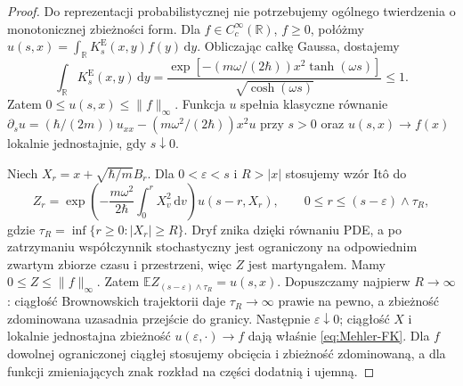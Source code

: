 \documentclass[11pt,a4paper,oneside]{report}
\numberwithin{equation}{chapter}
\theoremstyle{plain}
\theoremstyle{definition}
\theoremstyle{remark}
\newcommand{\R}{\mathbb{R}}
\newcommand{\E}{\mathbb{E}}
\newcommand{\dd}{\mathrm{d}}
\begin{document}
\begin{proof}
Do reprezentacji probabilistycznej nie potrzebujemy
ogólnego twierdzenia o monotonicznej zbieżności form.
Dla $f\in C_c^\infty(\R)$, $f\ge0$, połóżmy
$u(s,x)=\int_{\R}K_s^{\mathrm E}(x,y)f(y)\,\dd y$.
Obliczając całkę Gaussa, dostajemy
\[
 \int_{\R} K_s^{\mathrm E}(x,y)\,\dd y
 =\frac{\exp[-(m\omega/(2\hbar))x^2\tanh(\omega s)]}
        {\sqrt{\cosh(\omega s)}}\le1.
\]
Zatem $0\le u(s,x)\le\|f\|_\infty$.
Funkcja $u$ spełnia klasyczne równanie
$\partial_su=(\hbar/(2m))u_{xx}-(m\omega^2/(2\hbar))x^2u$
przy $s>0$ oraz $u(s,x)\to f(x)$ lokalnie jednostajnie,
gdy $s\downarrow0$.

Niech $X_r=x+\sqrt{\hbar/m}B_r$. Dla
$0<\varepsilon<s$ i $R>|x|$ stosujemy wzór Itô do
\[
 Z_r=\exp\left(-\frac{m\omega^2}{2\hbar}
 \int_0^rX_v^2\,\dd v\right)u(s-r,X_r),
 \qquad 0\le r\le(s-\varepsilon)\wedge\tau_R,
\]
gdzie $\tau_R=\inf\{r\ge0:|X_r|\ge R\}$.
Dryf znika dzięki równaniu PDE, a po zatrzymaniu
współczynnik stochastyczny jest ograniczony na
odpowiednim zwartym zbiorze czasu i przestrzeni,
więc $Z$ jest martyngałem. Mamy $0\le Z\le\|f\|_\infty$.
Zatem $\E Z_{(s-\varepsilon)\wedge\tau_R}=u(s,x)$.
Dopuszczamy najpierw $R\to\infty$: ciągłość Brownowskich
trajektorii daje $\tau_R\to\infty$ prawie na pewno,
a zbieżność zdominowana uzasadnia przejście do granicy.
Następnie $\varepsilon\downarrow0$; ciągłość $X$ i
lokalnie jednostajna zbieżność $u(\varepsilon,\cdot)\to f$
dają właśnie \eqref{eq:Mehler-FK}.
Dla $f$ dowolnej ograniczonej ciągłej stosujemy obcięcia
i zbieżność zdominowaną, a dla funkcji zmieniających znak
rozkład na części dodatnią i ujemną.


\end{proof}
\end{document}
